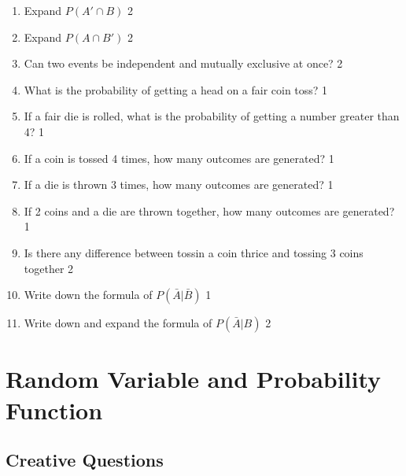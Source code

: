 \documentclass[a4paper,oneside, margin=1.4in]{book}
\begin{document}
\begin{enumerate}
\item Expand \( P(A' \cap B) \) \hfill 2

\item Expand \( P(A \cap B') \) \hfill 2

\item Can two events be independent and mutually exclusive at once? \hfill 2

\item What is the probability of getting a head on a fair coin toss? \hfill 1

\item If a fair die is rolled, what is the probability of getting a number greater than 4? \hfill 1

\item If a coin is tossed 4 times, how many outcomes are generated? \hfill 1

\item If a die is thrown 3 times, how many outcomes are generated? \hfill 1

\item If 2 coins and a die are thrown together, how many outcomes are generated? \hfill 1

\item Is there any difference between tossin a coin thrice and tossing 3 coins together \hfill 2

\item Write down the formula of $P(\bar A | \bar B)$ \hfill 1

\item Write down and expand the formula of $P(\bar A | B)$ \hfill 2


  \end{enumerate}

\chapter{Random Variable and Probability Function} 

\section{Creative Questions}
\end{document}
